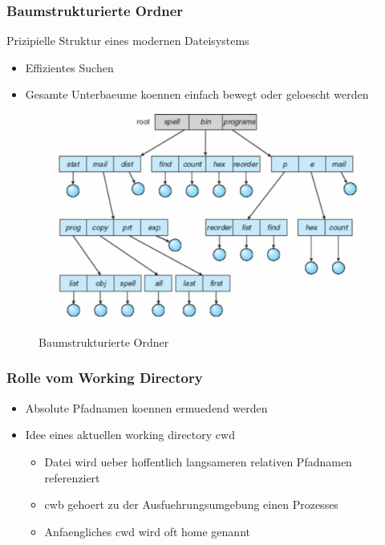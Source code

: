 \documentclass[a4paper]{scrreprt}
\begin{document}
\subsubsection{Baumstrukturierte Ordner}
Prizipielle Struktur eines modernen Dateisystems
\begin{itemize}
	\item Effizientes Suchen
	\item Gesamte Unterbaeume koennen einfach bewegt oder geloescht werden
\end{itemize}

\begin{figure}[ht]
\centering
\includegraphics[scale=0.3]{graphics/tree_structured_directories.png}
\caption{Baumstrukturierte Ordner}
\end{figure}

\subsubsection{Rolle vom Working Directory}
\begin{itemize}
	\item Absolute Pfadnamen koennen ermuedend werden
	\item Idee eines aktuellen working directory cwd
		\begin{itemize}
			\item Datei wird ueber hoffentlich langsameren relativen Pfadnamen referenziert
			\item cwb gehoert zu der Ausfuehrungsumgebung einen Prozesses
			\item Anfaengliches cwd wird oft home genannt
		\end{itemize}
\end{itemize}
\end{document}
